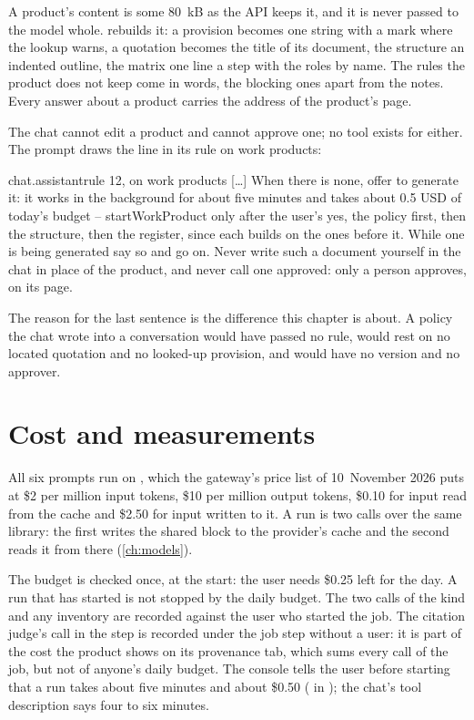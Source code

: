 A product's content is some 80~kB as the API keeps it, and it is never passed to the model
whole.  rebuilds it: a provision becomes one string with a mark where the
lookup warns, a quotation becomes the title of its document, the structure an indented
outline, the matrix one line a step with the roles by name. The rules the product does not
keep come in words, the blocking ones apart from the notes. Every answer about a product
carries the address of the product's page.

The chat cannot edit a product and cannot approve one; no tool exists for either. The prompt
 draws the line in its rule on work products:

\begin{promptexcerpt}{chat.assistant}{rule 12, on work products}
[…]
When there is none, offer to generate it: it works in the background for about five minutes and takes about 0.5 USD of today's budget – startWorkProduct only after the user's yes, the policy first, then the structure, then the register, since each builds on the ones before it. While one is being generated say so and go on. Never write such a document yourself in the chat in place of the product, and never call one approved: only a person approves, on its page.
\end{promptexcerpt}

The reason for the last sentence is the difference this chapter is about. A policy the chat
wrote into a conversation would have passed no rule, would rest on no located quotation and no
looked-up provision, and would have no version and no approver.


\section{Cost and measurements}\label{sec:programme:cost}

All six prompts run on , which the gateway's price list of 10~November 2026
puts at \$2 per million input tokens, \$10 per million output tokens, \$0.10 for input read
from the cache and \$2.50 for input written to it. A run is two calls over the same library:
the first writes the shared block to the provider's cache and the second reads it from there
(\cref{ch:models}).

The budget is checked once, at the start: the user needs \$0.25 left for the day. A run that
has started is not stopped by the daily budget. The two calls of the kind and any inventory
are recorded against the user who started the job. The citation judge's call in the
 step is recorded under the job step without a user: it is part of the cost
the product shows on its provenance tab, which sums every call of the job, but not of
anyone's daily budget. The console tells the user before starting that a run takes about five
minutes and about \$0.50 ( in );
the chat's tool description says four to six minutes.


